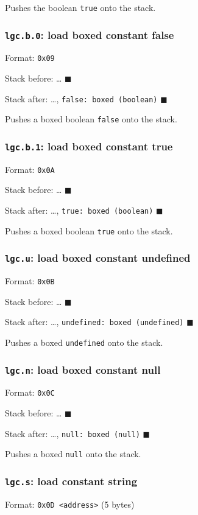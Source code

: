 Pushes the boolean \texttt{true} onto the stack.

\subsubsection{\texttt{lgc.b.0}: load boxed constant false}
\label{sec:orgdf93d05}
Format: \texttt{0x09}

Stack before: \ldots{} \(\blacksquare\)

Stack after: \ldots{}, \texttt{false: boxed (boolean)} \(\blacksquare\)

Pushes a boxed boolean \texttt{false} onto the stack.

\subsubsection{\texttt{lgc.b.1}: load boxed constant true}
\label{sec:org79cc95f}
Format: \texttt{0x0A}

Stack before: \ldots{} \(\blacksquare\)

Stack after: \ldots{}, \texttt{true: boxed (boolean)} \(\blacksquare\)

Pushes a boxed boolean \texttt{true} onto the stack.

\subsubsection{\texttt{lgc.u}: load boxed constant undefined}
\label{sec:org5d44e29}
Format: \texttt{0x0B}

Stack before: \ldots{} \(\blacksquare\)

Stack after: \ldots{}, \texttt{undefined: boxed (undefined)} \(\blacksquare\)

Pushes a boxed \texttt{undefined} onto the stack.

\subsubsection{\texttt{lgc.n}: load boxed constant null}
\label{sec:org1969f37}
Format: \texttt{0x0C}

Stack before: \ldots{} \(\blacksquare\)

Stack after: \ldots{}, \texttt{null: boxed (null)} \(\blacksquare\)

Pushes a boxed \texttt{null} onto the stack.

\subsubsection{\texttt{lgc.s}: load constant string}
\label{sec:org2f69311}
Format: \texttt{0x0D <address>} (5 bytes)


